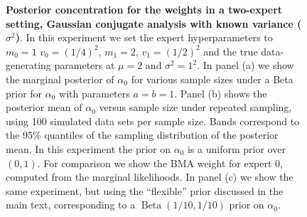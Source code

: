 \documentclass[12pt]{article}
\begin{document}
\begin{figure}[!ht]
\begin{center}
\end{center}
\caption{\textbf{Posterior concentration for the weights in a two-expert setting, Gaussian conjugate analysis with known variance ($\sigma^2$)}.
In this experiment we set the expert hyperparameters to $m_0 = 1$ $v_0 = (1/4)^2$, $m_1 = 2$, $v_1 = (1/2)^2$ and the true data-generating parameters at $\mu = 2$ and $\sigma^2 = 1^2$.
In panel (a) we show the marginal posterior of $\alpha_0$ for various sample sizes under a Beta prior for $\alpha_0$ with parameters $a = b = 1$.
Panel (b) shows the posterior mean of $\alpha_0$ versus sample size under repeated sampling, using 100 simulated data sets per sample size. 
Bands correspond to the 95\% quantiles of the sampling distribution of the posterior mean.
In this experiment the prior on $\alpha_0$ is a uniform prior over $(0, 1)$.
For comparison we show the BMA weight for expert 0, computed from the marginal likelihoods.
In panel (c) we show the same experiment, but using the ``flexible'' prior discussed in the main text, corresponding to a $\operatorname{Beta}(1/10, 1/10)$ prior on $\alpha_0$.
}
\label{fig:concentration_results_normal}
\end{figure}
\end{document}
